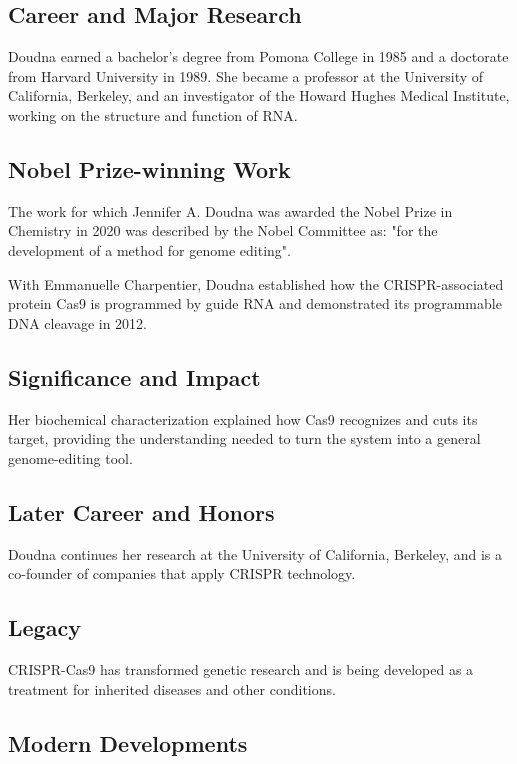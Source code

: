 \subsection*{Career and Major Research}

Doudna earned a bachelor's degree from Pomona College in 1985 and a doctorate from Harvard University in 1989. She became a professor at the University of California, Berkeley, and an investigator of the Howard Hughes Medical Institute, working on the structure and function of RNA.

\subsection*{Nobel Prize-winning Work}

The work for which Jennifer A. Doudna was awarded the Nobel Prize in Chemistry in 2020 was described by the Nobel Committee as: "for the development of a method for genome editing".

With Emmanuelle Charpentier, Doudna established how the CRISPR-associated protein Cas9 is programmed by guide RNA and demonstrated its programmable DNA cleavage in 2012.

\subsection*{Significance and Impact}

Her biochemical characterization explained how Cas9 recognizes and cuts its target, providing the understanding needed to turn the system into a general genome-editing tool.

\subsection*{Later Career and Honors}

Doudna continues her research at the University of California, Berkeley, and is a co-founder of companies that apply CRISPR technology.

\subsection*{Legacy}

CRISPR-Cas9 has transformed genetic research and is being developed as a treatment for inherited diseases and other conditions.

\subsection*{Modern Developments}

